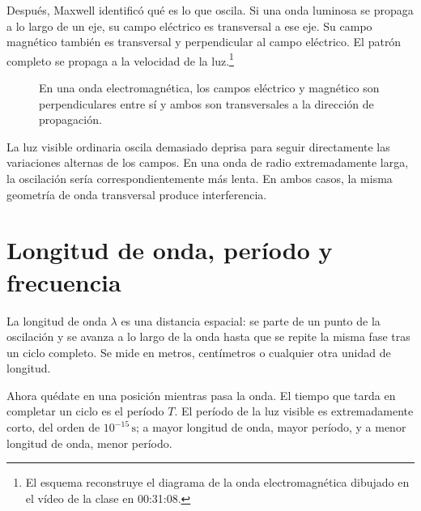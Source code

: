 Después, Maxwell identificó qué es lo que oscila. Si una onda luminosa se propaga a lo largo de un eje, su campo eléctrico es transversal a ese eje. Su campo magnético también es transversal y perpendicular al campo eléctrico. El patrón completo se propaga a la velocidad de la luz.\footnote{El esquema reconstruye el diagrama de la onda electromagnética dibujado en el vídeo de la clase en 00:31:08.}

\begin{figure}[h]
\centering
{}
\caption{En una onda electromagnética, los campos eléctrico y magnético son perpendiculares entre sí y ambos son transversales a la dirección de propagación.}
\end{figure}

La luz visible ordinaria oscila demasiado deprisa para seguir directamente las variaciones alternas de los campos. En una onda de radio extremadamente larga, la oscilación sería correspondientemente más lenta. En ambos casos, la misma geometría de onda transversal produce interferencia.

\section{Longitud de onda, período y frecuencia}

La longitud de onda \(\lambda\) es una distancia espacial: se parte de un punto de la oscilación y se avanza a lo largo de la onda hasta que se repite la misma fase tras un ciclo completo. Se mide en metros, centímetros o cualquier otra unidad de longitud.

Ahora quédate en una posición mientras pasa la onda. El tiempo que tarda en completar un ciclo es el período \(T\). El período de la luz visible es extremadamente corto, del orden de \(10^{-15}\,\mathrm{s}\); a mayor longitud de onda, mayor período, y a menor longitud de onda, menor período.

